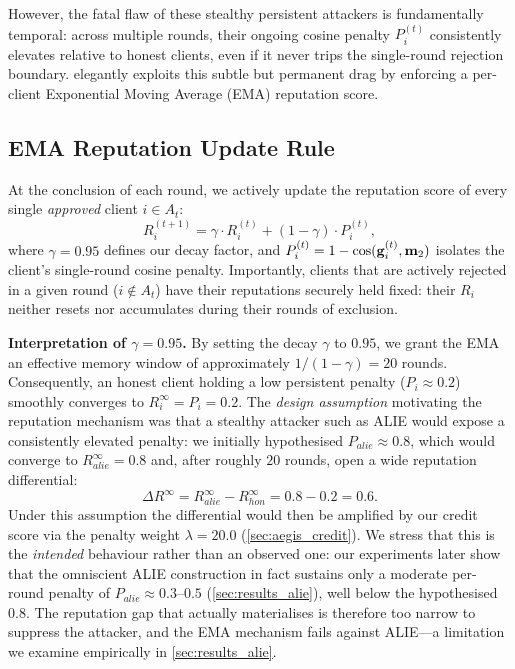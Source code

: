 \documentclass[../main.tex]{subfiles}
\begin{document}
However, the fatal flaw of these stealthy persistent attackers is fundamentally temporal: across multiple rounds, their ongoing cosine penalty $P_i^{(t)}$ consistently elevates relative to honest clients, even if it never trips the single-round rejection boundary. \aegis{} elegantly exploits this subtle but permanent drag by enforcing a per-client Exponential Moving Average (EMA) reputation score.

\subsection{EMA Reputation Update Rule}
\label{sec:aegis_ema}

At the conclusion of each round, we actively update the reputation score of every single \emph{approved} client $i \in A_t$:
\begin{equation}
    R_i^{(t+1)} = \gamma \cdot R_i^{(t)} + (1 - \gamma) \cdot P_i^{(t)},
    \label{eq:ema_reputation}
\end{equation}
where $\gamma = 0.95$ defines our decay factor, and $P_i^{(t)} = 1 - \cos(\mathbf{g}_{i}^{(t)}, \mathbf{m}_{2})$ isolates the client's single-round cosine penalty. Importantly, clients that are actively rejected in a given round ($i \notin A_t$) have their reputations securely held fixed: their $R_i$ neither resets nor accumulates during their rounds of exclusion.

\textbf{Interpretation of $\gamma = 0.95$.}
By setting the decay $\gamma$ to $0.95$, we grant the EMA an effective memory window of approximately $1/(1-\gamma) = 20$ rounds. Consequently, an honest client holding a low persistent penalty ($P_i \approx 0.2$) smoothly converges to $R_i^\infty = P_i = 0.2$. The \emph{design assumption} motivating the reputation mechanism was that a stealthy attacker such as ALIE would expose a consistently elevated penalty: we initially hypothesised $P_{alie} \approx 0.8$, which would converge to $R_{alie}^\infty = 0.8$ and, after roughly $20$ rounds, open a wide reputation differential:
\begin{equation}
    \Delta R^\infty = R_{alie}^\infty - R_{hon}^\infty = 0.8 - 0.2 = 0.6.
    \label{eq:reputation_gap}
\end{equation}
Under this assumption the differential would then be amplified by our credit score via the penalty weight $\lambda = 20.0$ (\cref{sec:aegis_credit}). We stress that this is the \emph{intended} behaviour rather than an observed one: our experiments later show that the omniscient ALIE construction in fact sustains only a moderate per-round penalty of $P_{alie} \approx 0.3$--$0.5$ (\cref{sec:results_alie}), well below the hypothesised $0.8$. The reputation gap that actually materialises is therefore too narrow to suppress the attacker, and the EMA mechanism fails against ALIE---a limitation we examine empirically in \cref{sec:results_alie}.
\end{document}
